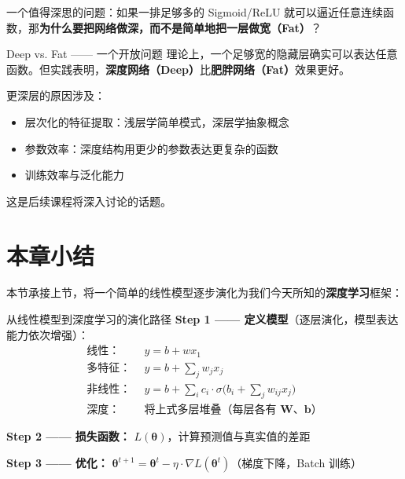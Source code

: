 \documentclass[a4paper]{article}
\begin{document}
一个值得深思的问题：如果一排足够多的 Sigmoid/ReLU 就可以逼近任意连续函数，那\textbf{为什么要把网络做深，而不是简单地把一层做宽（Fat）}？

\begin{knowledgebox}{Deep vs. Fat —— 一个开放问题}
    理论上，一个足够宽的隐藏层确实可以表达任意函数。但实践表明，\textbf{深度网络（Deep）}比\textbf{肥胖网络（Fat）}效果更好。

    更深层的原因涉及：
    \begin{itemize}
        \item 层次化的特征提取：浅层学简单模式，深层学抽象概念
        \item 参数效率：深度结构用更少的参数表达更复杂的函数
        \item 训练效率与泛化能力
    \end{itemize}

    这是后续课程将深入讨论的话题。
\end{knowledgebox}

\section{本章小结}

本节承接上节，将一个简单的线性模型逐步演化为我们今天所知的\textbf{深度学习}框架：

\begin{importantbox}{从线性模型到深度学习的演化路径}
    \textbf{Step 1 —— 定义模型}（逐层演化，模型表达能力依次增强）：
    \[
    \begin{aligned}
    \text{线性：} &\ \ y = b + wx_1 \\[3pt]
    \text{多特征：} &\ \ y = b + \sum_j w_j x_j \\[3pt]
    \text{非线性：} &\ \ y = b + \sum_i c_i \cdot \sigma\!\Big(b_i + \sum_j w_{ij} x_j\Big) \\[3pt]
    \text{深度：} &\ \ \text{将上式多层堆叠（每层各有 }\boldsymbol{W}\text{、}\boldsymbol{b}\text{）}
    \end{aligned}
    \]

    \textbf{Step 2 —— 损失函数：} $L(\boldsymbol{\theta})$，计算预测值与真实值的差距

    \textbf{Step 3 —— 优化：} $\boldsymbol{\theta}^{t+1} = \boldsymbol{\theta}^{t} - \eta \cdot \nabla L(\boldsymbol{\theta}^{t})$（梯度下降，Batch 训练）
\end{importantbox}
\end{document}
